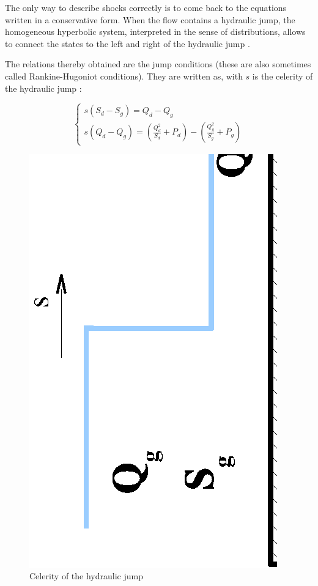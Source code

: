 \vspace{0.5cm}

The only way to describe shocks correctly is to come back to the equations written in a conservative form. When the flow contains a hydraulic jump, the homogeneous hyperbolic system, interpreted in the sense of distributions, allows to connect the states to the left and right of the hydraulic jump \cite{GODLEWSKI91}.

\vspace{0.5cm}

The relations thereby obtained are the jump conditions (these are also sometimes called Rankine-Hugoniot conditions). They are written as, with $s$ is the celerity of the hydraulic jump :

\begin{equation}
   \left \lbrace
  \begin{array}{l}
   s ( S_d -S_g ) = Q_d - Q_g \\
   s ( Q_d - Q_g ) = \left ( \frac{Q_{d}^2}{S_d} + P_d \right ) - \left ( \frac{Q_{g}^2}{S_g} + P_g \right )
  \end{array}
 \right.
\end{equation}

\begin{figure}
 \begin{center}
  \includegraphics[scale=0.7,angle=270]{Figures/Vitesse.eps} \hspace{1cm}
  \vspace{1.cm}
  \caption{Celerity of the hydraulic jump}
 \end{center}
\end{figure}

